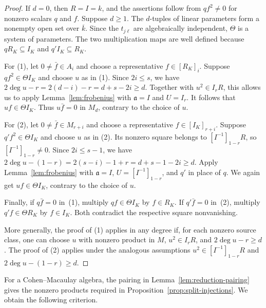\documentclass[a4paper,11pt]{amsart}
\newcommand{\kk}{k}
\theoremstyle{definition}
\begin{document}
\begin{proof}
If $d=0$, then $R=I=\kk$, and the assertions follow from $qf^2\ne0$ for nonzero scalars $q$ and $f$. Suppose $d\geq1$. The $d$-tuples of linear parameters form a nonempty open set over $\overline{\kk}$. Since the $t_{j\ell}$ are algebraically independent, $\Theta$ is a system of parameters. The two multiplication maps are well defined because $qR_K\subseteq I_K$ and $q'I_K\subseteq R_K$.

For \textup{(1)}, let $0\neq\bar f\in A_i$ and choose a representative $f\in[R_K]_i$. Suppose $qf^2\in\Theta I_K$ and choose $u$ as in \textup{(1)}. Since $2i\leq s$, we have $2\deg u-r=2(d-i)-r=d+s-2i\geq d$. Together with $u^2\in I_rR$, this allows us to apply Lemma~\ref{lem:frobenius} with $\mathfrak a=I$ and $U=I_r$. It follows that $uf\in\Theta I_K$. Thus $u\bar f=0$ in $M_d$, contrary to the choice of $u$.

For \textup{(2)}, let $0\neq\bar f\in M_{r+i}$ and choose a representative $f\in[I_K]_{r+i}$. Suppose $q'f^2\in\Theta I_K$ and choose $u$ as in \textup{(2)}. Its nonzero square belongs to $[I^{-1}]_{1-r}R$, so $[I^{-1}]_{1-r}\neq0$. Since $2i\leq s-1$, we have $2\deg u-(1-r)=2(s-i)-1+r=d+s-1-2i\geq d$. Apply Lemma~\ref{lem:frobenius} with $\mathfrak a=I$, $U=[I^{-1}]_{1-r}$, and $q'$ in place of $q$. We again get $u f\in\Theta I_K$, contrary to the choice of $u$.

Finally, if $q\bar f=0$ in~\textup{(1)}, multiply $qf\in\Theta I_K$ by $f\in R_K$. If $q'\bar f=0$ in~\textup{(2)}, multiply $q'f\in\Theta R_K$ by $f\in I_K$. Both contradict the respective square nonvanishing.

More generally, the proof of \textup{(1)} applies in any degree if, for each nonzero source class, one can choose $u$ with nonzero product in $M$, $u^2\in I_rR$, and $2\deg u-r\ge d$. The proof of \textup{(2)} applies under the analogous assumptions $u^2\in[I^{-1}]_{1-r}R$ and $2\deg u-(1-r)\ge d$.
\end{proof}

For a Cohen--Macaulay algebra, the pairing in Lemma~\ref{lem:reduction-pairing} gives the nonzero products required in Proposition~\ref{prop:split-injections}. We obtain the following criterion.
\end{document}
